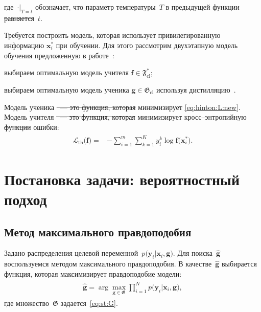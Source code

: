 \documentclass[12pt]{a&t}
\providecommand{\DIFadd}[1]{{\protect\color{blue}\uwave{#1}}} %
\providecommand{\DIFdel}[1]{{\protect\color{red}\sout{#1}}}                      %
\providecommand{\DIFaddbegin}{} %
\providecommand{\DIFaddend}{} %
\providecommand{\DIFdelbegin}{} %
\providecommand{\DIFdelend}{} %
\newcommand{\DIFscaledelfig}{0.5}
\newlength{\DIFdelgraphicswidth} %
\newlength{\DIFdelgraphicsheight} %
\newcommand{\DIFaddincludegraphics}[2][]{{\color{blue}\fbox{\DIFOincludegraphics[#1]{#2}}}} %
\newcommand{\DIFdelincludegraphics}[2][]{%
\sbox{\DIFdelgraphicsbox}{\DIFOincludegraphics[#1]{#2}}%
\settoboxwidth{\DIFdelgraphicswidth}{\DIFdelgraphicsbox} %
\settoboxtotalheight{\DIFdelgraphicsheight}{\DIFdelgraphicsbox} %
\scalebox{\DIFscaledelfig}{%
\parbox[b]{\DIFdelgraphicswidth}{\usebox{\DIFdelgraphicsbox}\\[-\baselineskip] \rule{\DIFdelgraphicswidth}{0em}}\llap{\resizebox{\DIFdelgraphicswidth}{\DIFdelgraphicsheight}{%
\setlength{\unitlength}{\DIFdelgraphicswidth}%
\begin{picture}(1,1)%
\thicklines\linethickness{2pt} %
{\color[rgb]{1,0,0}\put(0,0){\framebox(1,1){}}}%
{\color[rgb]{1,0,0}\put(0,0){\line( 1,1){1}}}%
{\color[rgb]{1,0,0}\put(0,1){\line(1,-1){1}}}%
\end{picture}%
}\hspace*{3pt}}} %
} %
\DeclareRobustCommand{\DIFaddbegin}{\DIFOaddbegin \let\includegraphics\DIFaddincludegraphics} %
\DeclareRobustCommand{\DIFaddend}{\DIFOaddend \let\includegraphics\DIFOincludegraphics} %
\DeclareRobustCommand{\DIFdelbegin}{\DIFOdelbegin \let\includegraphics\DIFdelincludegraphics} %
\DeclareRobustCommand{\DIFdelend}{\DIFOaddend \let\includegraphics\DIFOincludegraphics} %
\begin{document}
где~$\cdot\bigr|_{T=t}$ обозначает, что параметр температуры~$T$ в предыдущей функции \DIFdelbegin \DIFdel{равняется}\DIFdelend \DIFaddbegin \DIFadd{равен}\DIFaddend ~$t$.

Требуется построить модель, которая использует привилегированную информацию $\mathbf{x}^*_i$ при обучении. Для этого рассмотрим двухэтапную модель обучения предложенную в работе~\cite{Lopez2016}:
\begin{enumlist}
    \item выбираем оптимальную модель учителя $\mathbf{f} \in \mathfrak{F}_{\text{cl}}^*$;
    \item выбираем оптимальную модель ученика $\mathbf{g} \in \mathfrak{G}_{\text{cl}}$ используя дистилляцию~\cite{Hinton2015}. 
\end{enumlist}

Модель ученика \DIFdelbegin \DIFdel{~--- это функция, которая }\DIFdelend минимизирует \eqref{eq:hinton:L:new}. Модель учителя \DIFdelbegin \DIFdel{~--- это функция, которая }\DIFdelend минимизирует кросс--энтропийную \DIFdelbegin \DIFdel{функции }\DIFdelend \DIFaddbegin \DIFadd{функцию }\DIFaddend ошибки:
\begin{gather}
\label{eq:hinton.2}
\DIFdelbegin %
\DIFdelend \DIFaddbegin \begin{aligned}
   \mathcal{L}_\text{th}\bigr(\mathbf{f}\bigr) = &-\sum_{i=1}^{m}{{\sum_{k=1}^{K}y^k_i\log\mathbf{f}\bigr(\mathbf{x}^*_i\bigr)}}.
   \end{aligned}\DIFaddend 
\end{gather}

\section{Постановка задачи: вероятностный подход}

\subsection{Метод максимального правдоподобия}
Задано распределения целевой переменной~$p\bigr(\mathbf{y}_i|\mathbf{x}_i, \mathbf{g}\bigr)$.
Для поиска~$\hat{\mathbf{g}}$ воспользуемся методом максимального правдоподобия. В качестве~$\hat{\mathbf{g}}$ выбирается функция, которая максимизирует правдоподобие модели:
\begin{gather}
\label{eq:st:7}
\begin{aligned}
\hat{\mathbf{g}} = \arg\max_{\mathbf{g}\in \mathfrak{G}} \prod_{i=1}^{N}p\bigr(\mathbf{y}_{i}|\mathbf{x}_i, \mathbf{g}\bigr),
\end{aligned}
\end{gather}
где множество~$\mathfrak{G}$ задается~\eqref{eq:st:G}.
\end{document}
